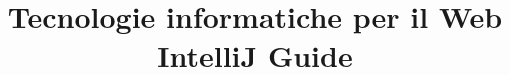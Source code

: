 \documentclass[12pt]{extarticle}
\title{
  Tecnologie informatiche per il Web \\
  IntelliJ Guide
}
\date{}
\begin{document}
\maketitle
\tableofcontents

\let\latexsection\section
\renewcommand{\section}{
  \newpage
  \latexsection
}




\end{document}
